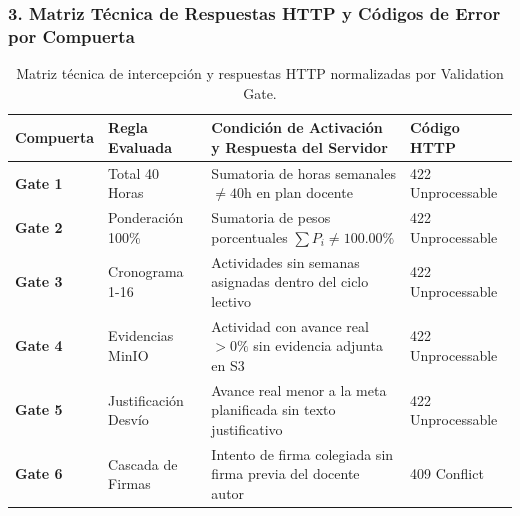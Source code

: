 \documentclass[12pt,a4paper]{article}
\begin{document}
\subsubsection*{3. Matriz Técnica de Respuestas HTTP y Códigos de Error por Compuerta}
\begin{table}[H]
\centering
\small
\renewcommand{\arraystretch}{1.2}
\begin{tabularx}{\textwidth}{|>{\hsize=0.5\hsize\centering\arraybackslash\bfseries\footnotesize}X|>{\hsize=0.9\hsize\raggedright\arraybackslash\footnotesize}X|>{\hsize=1.8\hsize\raggedright\arraybackslash\footnotesize}X|>{\hsize=0.8\hsize\centering\arraybackslash\footnotesize}X|}
\hline
\rowcolor{tableheader}
\textbf{Compuerta} & \textbf{Regla Evaluada} & \textbf{Condición de Activación y Respuesta del Servidor} & \textbf{Código HTTP} \\
\hline
Gate 1 & Total 40 Horas & Sumatoria de horas semanales $\ne 40$h en plan docente & 422 Unprocessable \\
\hline
Gate 2 & Ponderación 100\% & Sumatoria de pesos porcentuales $\sum P_i \ne 100.00\%$ & 422 Unprocessable \\
\hline
Gate 3 & Cronograma 1-16 & Actividades sin semanas asignadas dentro del ciclo lectivo & 422 Unprocessable \\
\hline
Gate 4 & Evidencias MinIO & Actividad con avance real $>0\%$ sin evidencia adjunta en S3 & 422 Unprocessable \\
\hline
Gate 5 & Justificación Desvío & Avance real menor a la meta planificada sin texto justificativo & 422 Unprocessable \\
\hline
Gate 6 & Cascada de Firmas & Intento de firma colegiada sin firma previa del docente autor & 409 Conflict \\
\hline
\end{tabularx}
\caption{Matriz técnica de intercepción y respuestas HTTP normalizadas por Validation Gate.}
\end{table}
\end{document}
